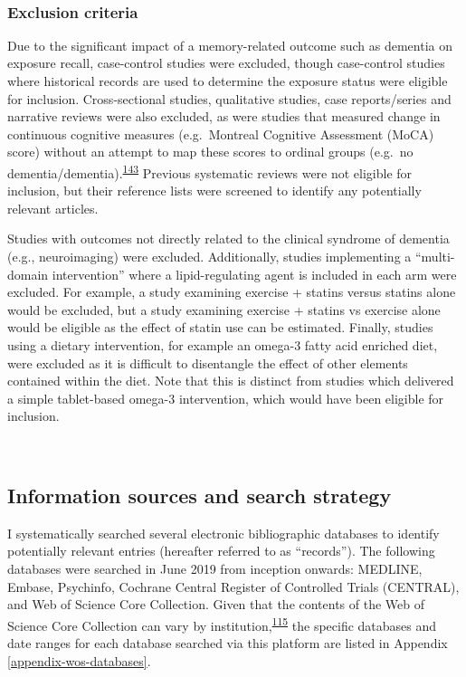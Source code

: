 \documentclass[a4paper, twoside]{templates/ociamthesis}
\begin{document}
~

\hypertarget{exclusion-criteria}{%
\subsubsection{Exclusion criteria}\label{exclusion-criteria}}

Due to the significant impact of a memory-related outcome such as dementia on exposure recall, case-control studies were excluded, though case-control studies where historical records are used to determine the exposure status were eligible for inclusion. Cross-sectional studies, qualitative studies, case reports/series and narrative reviews were also excluded, as were studies that measured change in continuous cognitive measures (e.g.~Montreal Cognitive Assessment (MoCA) score) without an attempt to map these scores to ordinal groups (e.g.~no dementia/dementia).\textsuperscript{\protect\hyperlink{ref-tennant2021}{143}} Previous systematic reviews were not eligible for inclusion, but their reference lists were screened to identify any potentially relevant articles.

Studies with outcomes not directly related to the clinical syndrome of dementia (e.g., neuroimaging) were excluded. Additionally, studies implementing a ``multi-domain intervention'' where a lipid-regulating agent is included in each arm were excluded. For example, a study examining exercise + statins versus statins alone would be excluded, but a study examining exercise + statins vs exercise alone would be eligible as the effect of statin use can be estimated. Finally, studies using a dietary intervention, for example an omega-3 fatty acid enriched diet, were excluded as it is difficult to disentangle the effect of other elements contained within the diet. Note that this is distinct from studies which delivered a simple tablet-based omega-3 intervention, which would have been eligible for inclusion.

~

\hypertarget{information-sources-and-search-strategy}{%
\subsection{Information sources and search strategy}\label{information-sources-and-search-strategy}}

I systematically searched several electronic bibliographic databases to identify potentially relevant entries (hereafter referred to as ``records''). The following databases were searched in June 2019 from inception onwards: MEDLINE, Embase, Psychinfo, Cochrane Central Register of Controlled Trials (CENTRAL), and Web of Science Core Collection. Given that the contents of the Web of Science Core Collection can vary by institution,\textsuperscript{\protect\hyperlink{ref-gusenbauer2020}{115}} the specific databases and date ranges for each database searched via this platform are listed in Appendix \ref{appendix-wos-databases}.
\end{document}
